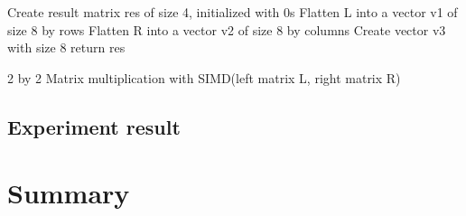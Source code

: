 \documentclass{sig-alternate}
\begin{document}
\begin{algorithm}[]
\SetAlgoLined
 Create result matrix res of size 4, initialized with 0s\;
 Flatten L into a vector v1 of size 8 by rows\;
 Flatten R into a vector v2 of size 8 by columns\;
Create vector v3 with size 8\;
 return res\;
 \caption{2 by 2 Matrix multiplication with SIMD(left matrix L, right matrix R)}
\end{algorithm}

\subsection{Experiment result}

\section{Summary}
\end{document}
